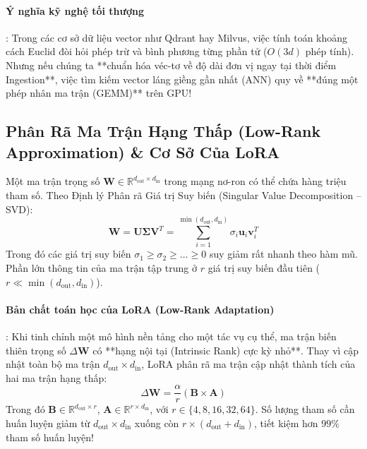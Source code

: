 \paragraph{Ý nghĩa kỹ nghệ tối thượng}:
Trong các cơ sở dữ liệu vector như Qdrant hay Milvus, việc tính toán khoảng cách Euclid đòi hỏi phép trừ và bình phương từng phần tử ($O(3d)$ phép tính). Nhưng nếu chúng ta **chuẩn hóa véc-tơ về độ dài đơn vị ngay tại thời điểm Ingestion**, việc tìm kiếm vector láng giềng gần nhất (ANN) quy về **đúng một phép nhân ma trận (GEMM)** trên GPU!

\subsection{Phân Rã Ma Trận Hạng Thấp (Low-Rank Approximation) \& Cơ Sở Của LoRA}

Một ma trận trọng số $\mathbf{W} \in \mathbb{R}^{d_{\text{out}} \times d_{\text{in}}}$ trong mạng nơ-ron có thể chứa hàng triệu tham số. Theo Định lý Phân rã Giá trị Suy biến (Singular Value Decomposition -- SVD):
\begin{equation}
\mathbf{W} = \mathbf{U} \mathbf{\Sigma} \mathbf{V}^T = \sum_{i=1}^{\min(d_{\text{out}}, d_{\text{in}})} \sigma_i \mathbf{u}_i \mathbf{v}_i^T
\label{eq:svd-theorem}
\end{equation}
Trong đó các giá trị suy biến $\sigma_1 \ge \sigma_2 \ge \dots \ge 0$ suy giảm rất nhanh theo hàm mũ. Phần lớn thông tin của ma trận tập trung ở $r$ giá trị suy biến đầu tiên ($r \ll \min(d_{\text{out}}, d_{\text{in}})$).

\paragraph{Bản chất toán học của LoRA (Low-Rank Adaptation)}:
Khi tinh chỉnh một mô hình nền tảng cho một tác vụ cụ thể, ma trận biến thiên trọng số $\Delta \mathbf{W}$ có **hạng nội tại (Intrinsic Rank) cực kỳ nhỏ**. Thay vì cập nhật toàn bộ ma trận $d_{\text{out}} \times d_{\text{in}}$, LoRA phân rã ma trận cập nhật thành tích của hai ma trận hạng thấp:
\begin{equation}
\Delta \mathbf{W} = \frac{\alpha}{r} \left( \mathbf{B} \times \mathbf{A} \right)
\label{eq:lora-decomposition}
\end{equation}
Trong đó $\mathbf{B} \in \mathbb{R}^{d_{\text{out}} \times r}$, $\mathbf{A} \in \mathbb{R}^{r \times d_{\text{in}}}$, với $r \in \{4, 8, 16, 32, 64\}$. Số lượng tham số cần huấn luyện giảm từ $d_{\text{out}} \times d_{\text{in}}$ xuống còn $r \times (d_{\text{out}} + d_{\text{in}})$, tiết kiệm hơn $99\%$ tham số huấn luyện!

